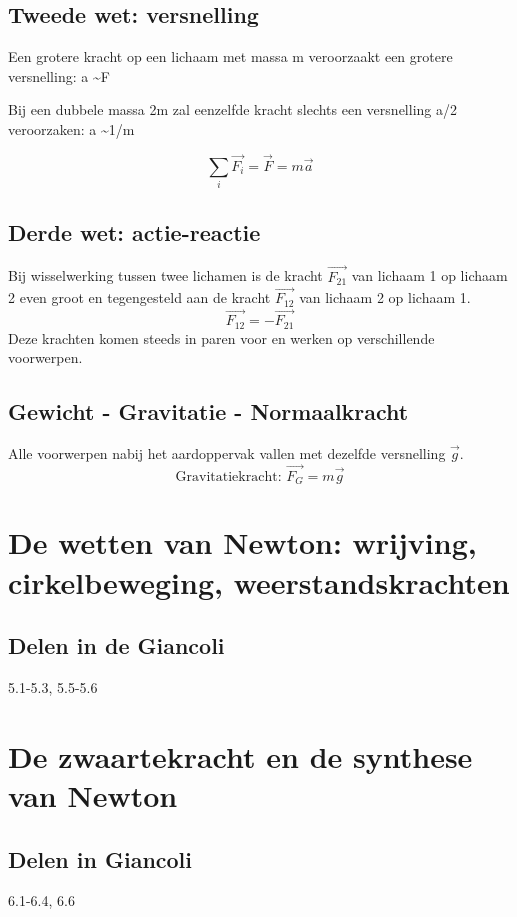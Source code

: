 \documentclass[12pt,a4paper]{article}
\begin{document}
    \subsection{Tweede wet: versnelling}
    Een grotere kracht op een lichaam met massa m veroorzaakt een grotere versnelling: a \textasciitilde F

    Bij een dubbele massa 2m zal eenzelfde kracht slechts een versnelling a/2 veroorzaken: a \textasciitilde 1/m

    \[\sum_{i} \overrightarrow{F_i} = \overrightarrow{F} = m\overrightarrow{a}\]

    \subsection{Derde wet: actie-reactie}
    Bij wisselwerking tussen twee lichamen is de kracht \(\overrightarrow{F_{21}}\) van lichaam 1 op lichaam 2 even groot en tegengesteld aan de kracht \(\overrightarrow{F_{12}}\) van lichaam 2 op lichaam 1.
    \[\overrightarrow{F_{12}} = -\overrightarrow{F_{21}}\]
    Deze krachten komen steeds in paren voor en werken op verschillende voorwerpen.

    \subsection{Gewicht - Gravitatie - Normaalkracht}
    Alle voorwerpen nabij het aardoppervak vallen met dezelfde versnelling $\overrightarrow{g}$.
    \[\text{Gravitatiekracht: } \overrightarrow{F_G} = m\overrightarrow{g}\]


    \section{De wetten van Newton: wrijving, cirkelbeweging, weerstandskrachten}

    \subsection{Delen in de Giancoli}
    5.1-5.3, 5.5-5.6


    \section{De zwaartekracht en de synthese van Newton}

    \subsection{Delen in Giancoli}
    6.1-6.4, 6.6
\end{document}
